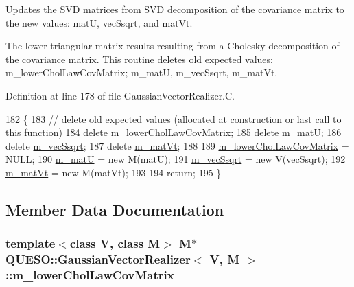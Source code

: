 Updates the S\-V\-D matrices from S\-V\-D decomposition of the covariance matrix to the new values\-: {\ttfamily mat\-U}, {\ttfamily vec\-Ssqrt}, and {\ttfamily mat\-Vt}. 

The lower triangular matrix results resulting from a Cholesky decomposition of the covariance matrix. This routine deletes old expected values\-: m\-\_\-lower\-Chol\-Law\-Cov\-Matrix; m\-\_\-mat\-U, m\-\_\-vec\-Ssqrt, m\-\_\-mat\-Vt. 

Definition at line 178 of file Gaussian\-Vector\-Realizer.\-C.


\begin{DoxyCode}
182 \{
183   \textcolor{comment}{// delete old expected values (allocated at construction or last call to this function)}
184   \textcolor{keyword}{delete} \hyperlink{class_q_u_e_s_o_1_1_gaussian_vector_realizer_ac5cc90b95dddd02a987f45af652f4495}{m\_lowerCholLawCovMatrix};
185   \textcolor{keyword}{delete} \hyperlink{class_q_u_e_s_o_1_1_gaussian_vector_realizer_a62aebd74fe00824ceed9724b8c41cfa7}{m\_matU};
186   \textcolor{keyword}{delete} \hyperlink{class_q_u_e_s_o_1_1_gaussian_vector_realizer_a473a7c1e61dd0b311bb7da6c244cb53d}{m\_vecSsqrt};
187   \textcolor{keyword}{delete} \hyperlink{class_q_u_e_s_o_1_1_gaussian_vector_realizer_aa121afe8cf67cea2a52552b4d12d57b8}{m\_matVt};
188 
189   \hyperlink{class_q_u_e_s_o_1_1_gaussian_vector_realizer_ac5cc90b95dddd02a987f45af652f4495}{m\_lowerCholLawCovMatrix} = NULL;
190   \hyperlink{class_q_u_e_s_o_1_1_gaussian_vector_realizer_a62aebd74fe00824ceed9724b8c41cfa7}{m\_matU}                  = \textcolor{keyword}{new} M(matU);
191   \hyperlink{class_q_u_e_s_o_1_1_gaussian_vector_realizer_a473a7c1e61dd0b311bb7da6c244cb53d}{m\_vecSsqrt}              = \textcolor{keyword}{new} V(vecSsqrt);
192   \hyperlink{class_q_u_e_s_o_1_1_gaussian_vector_realizer_aa121afe8cf67cea2a52552b4d12d57b8}{m\_matVt}                 = \textcolor{keyword}{new} M(matVt);
193 
194   \textcolor{keywordflow}{return};
195 \}
\end{DoxyCode}


\subsection{Member Data Documentation}
\hypertarget{class_q_u_e_s_o_1_1_gaussian_vector_realizer_ac5cc90b95dddd02a987f45af652f4495}{
\subsubsection[{m\-\_\-lower\-Chol\-Law\-Cov\-Matrix}]{\setlength{\rightskip}{0pt plus 5cm}template$<$class V, class M$>$ M$\ast$ {\bf Q\-U\-E\-S\-O\-::\-Gaussian\-Vector\-Realizer}$<$ V, M $>$\-::m\-\_\-lower\-Chol\-Law\-Cov\-Matrix\hspace{0.3cm}{\ttfamily [private]}}}\label{class_q_u_e_s_o_1_1_gaussian_vector_realizer_ac5cc90b95dddd02a987f45af652f4495}


